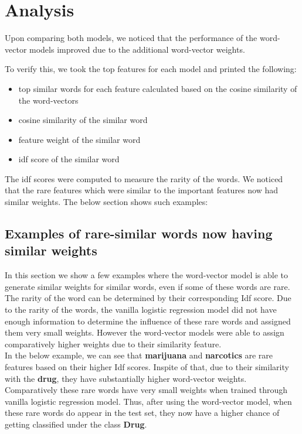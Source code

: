 \newpage
\section{Analysis}
Upon comparing both models, we noticed that the performance of the word-vector models improved due to the additional word-vector weights.

To verify this, we took the top features for each model and printed the following:

\begin{itemize}
\item top similar words for each feature calculated based on the cosine similarity of the word-vectors

\item cosine similarity of the similar word

\item feature weight of the similar word

\item idf score of the similar word
\end{itemize}

The idf scores were computed to measure the rarity of the words. We noticed that the rare features which were similar to the important features now had similar weights. The below section shows such examples:

\subsection{Examples of rare-similar words now having similar weights}

In this section we show a few examples where the word-vector model is able to generate similar weights for similar words, even if some of these words are rare. The rarity of the word can be determined by their corresponding Idf score. Due to the rarity of the words, the vanilla logistic regression model did not have enough information to determine the influence of these rare words and assigned them very small weights. However the word-vector models were able to assign comparatively higher weights due to their similarity feature. \\

In the below example, we can see that \textbf{marijuana} and \textbf{narcotics} are rare features based on their higher Idf scores. Inspite of that, due to their similarity with the \textbf{drug}, they have substantially higher word-vector weights. Comparatively these rare words have very small weights when trained through vanilla logistic regression model. Thus, after using the word-vector model, when these rare words do appear in the test set, they now have a higher chance of getting classified under the class \textbf{Drug}.

